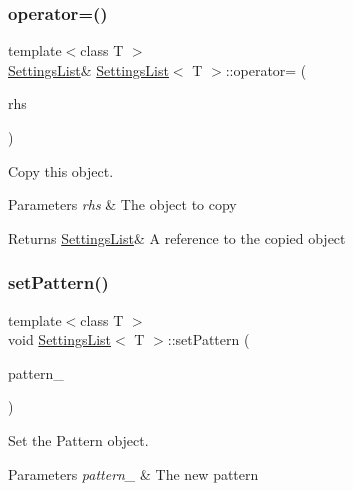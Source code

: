\subsubsection{\texorpdfstring{operator=()}{operator=()}}
{\footnotesize\ttfamily template$<$class T $>$ \\
\hyperlink{class_settings_list}{Settings\+List}\& \hyperlink{class_settings_list}{Settings\+List}$<$ T $>$\+::operator= (\begin{DoxyParamCaption}\item[{\hyperlink{class_settings_list}{Settings\+List}$<$ T $>$ const \&}]{rhs }\end{DoxyParamCaption})\hspace{0.3cm}{\ttfamily [inline]}}



Copy this object. 


\begin{DoxyParams}{Parameters}
{\em rhs} & The object to copy \\
\hline
\end{DoxyParams}
\begin{DoxyReturn}{Returns}
\hyperlink{class_settings_list}{Settings\+List}\& A reference to the copied object 
\end{DoxyReturn}
\mbox{\label{class_settings_list_a351b4d9b96ecbf7778d1b2593f0bc0a3}} 
\subsubsection{\texorpdfstring{set\+Pattern()}{setPattern()}}
{\footnotesize\ttfamily template$<$class T $>$ \\
void \hyperlink{class_settings_list}{Settings\+List}$<$ T $>$\+::set\+Pattern (\begin{DoxyParamCaption}\item[{T $\ast$}]{pattern\+\_\+ }\end{DoxyParamCaption})\hspace{0.3cm}{\ttfamily [inline]}}



Set the Pattern object. 


\begin{DoxyParams}{Parameters}
{\em pattern\+\_\+} & The new pattern \\
\hline
\end{DoxyParams}


